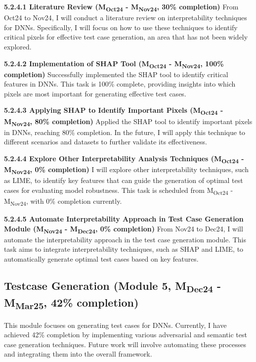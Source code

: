 \noindent \textbf{5.2.4.1 Literature Review (M\textsubscript{Oct24} - M\textsubscript{Nov24}, 30\% completion)} From Oct24 to Nov24, I will conduct a literature review on interpretability techniques for DNNs. Specifically, I will focus on how to use these techniques to identify critical pixels for effective test case generation, an area that has not been widely explored.

\noindent \textbf{5.2.4.2 Implementation of SHAP Tool (M\textsubscript{Oct24} - M\textsubscript{Nov24}, 100\% completion)} Successfully implemented the SHAP tool to identify critical features in DNNs. This task is 100\% complete, providing insights into which pixels are most important for generating effective test cases.

\noindent \textbf{5.2.4.3 Applying SHAP to Identify Important Pixels (M\textsubscript{Oct24} - M\textsubscript{Nov24}, 80\% completion)} Applied the SHAP tool to identify important pixels in DNNs, reaching 80\% completion. In the future, I will apply this technique to different scenarios and datasets to further validate its effectiveness.


\noindent \textbf{5.2.4.4 Explore Other Interpretability Analysis Techniques (M\textsubscript{Oct24} - M\textsubscript{Nov24}, 0\% completion)} I will explore other interpretability techniques, such as LIME, to identify key features that can guide the generation of optimal test cases for evaluating model robustness. This task is scheduled from M\textsubscript{Oct24} - M\textsubscript{Nov24}, with 0\% completion currently.


\noindent \textbf{5.2.4.5 Automate Interpretability Approach in Test Case Generation Module (M\textsubscript{Nov24} - M\textsubscript{Dec24}, 0\% completion)} From Nov24 to Dec24, I will automate the interpretability approach in the test case generation module. This task aims to integrate interpretability techniques, such as SHAP and LIME, to automatically generate optimal test cases based on key features.


\subsection{Testcase Generation (Module 5, M\textsubscript{Dec24} - M\textsubscript{Mar25}, 42\% completion)} This module focuses on generating test cases for DNNs. Currently, I have achieved 42\% completion by implementing various adversarial and semantic test case generation techniques. Future work will involve automating these processes and integrating them into the overall framework.

